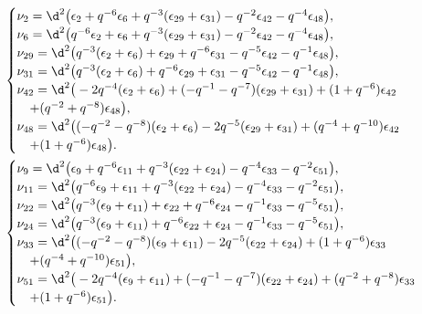 \begin{align*}
&\begin{cases}
\nu_{2} = \d^{2}\big(\epsilon_{2} + q^{-6}\epsilon_{6} + q^{-3}(\epsilon_{29}+\epsilon_{31}) - q^{-2}\epsilon_{42} - q^{-4}\epsilon_{48}\big),\\
\nu_{6} = \d^{2}\big(q^{-6}\epsilon_{2} + \epsilon_{6} + q^{-3}(\epsilon_{29}+\epsilon_{31}) - q^{-2}\epsilon_{42} - q^{-4}\epsilon_{48}\big),\\
\nu_{29} = \d^{2}\big(q^{-3}(\epsilon_{2}+\epsilon_{6}) + \epsilon_{29} + q^{-6}\epsilon_{31} - q^{-5}\epsilon_{42} - q^{-1}\epsilon_{48}\big),\\
\nu_{31} = \d^{2}\big(q^{-3}(\epsilon_{2}+\epsilon_{6}) + q^{-6}\epsilon_{29} + \epsilon_{31} - q^{-5}\epsilon_{42} - q^{-1}\epsilon_{48}\big),\\
\nu_{42} = \d^{2}\big(-2q^{-4}(\epsilon_{2}+\epsilon_{6}) + (-q^{-1} - q^{-7})(\epsilon_{29}+\epsilon_{31}) + (1 + q^{-6})\epsilon_{42}\\
\quad+ (q^{-2} + q^{-8})\epsilon_{48}\big),\\
\nu_{48} = \d^{2}\big((-q^{-2} - q^{-8})(\epsilon_{2}+\epsilon_{6}) - 2q^{-5}(\epsilon_{29}+\epsilon_{31}) + (q^{-4} + q^{-10})\epsilon_{42}\\
\quad+ (1 + q^{-6})\epsilon_{48}\big).
\end{cases}
\\
&\begin{cases}
\nu_{9} = \d^{2}\big(\epsilon_{9} + q^{-6}\epsilon_{11} + q^{-3}(\epsilon_{22}+\epsilon_{24}) - q^{-4}\epsilon_{33} - q^{-2}\epsilon_{51}\big),\\
\nu_{11} = \d^{2}\big(q^{-6}\epsilon_{9} + \epsilon_{11} + q^{-3}(\epsilon_{22}+\epsilon_{24}) - q^{-4}\epsilon_{33} - q^{-2}\epsilon_{51}\big),\\
\nu_{22} = \d^{2}\big(q^{-3}(\epsilon_{9}+\epsilon_{11}) + \epsilon_{22} + q^{-6}\epsilon_{24} - q^{-1}\epsilon_{33} - q^{-5}\epsilon_{51}\big),\\
\nu_{24} = \d^{2}\big(q^{-3}(\epsilon_{9}+\epsilon_{11}) + q^{-6}\epsilon_{22} + \epsilon_{24} - q^{-1}\epsilon_{33} - q^{-5}\epsilon_{51}\big),\\
\nu_{33} = \d^{2}\big((-q^{-2} - q^{-8})(\epsilon_{9}+\epsilon_{11}) - 2q^{-5}(\epsilon_{22}+\epsilon_{24}) + (1 + q^{-6})\epsilon_{33}\\
\quad+ (q^{-4} + q^{-10})\epsilon_{51}\big),\\
\nu_{51} = \d^{2}\big(-2q^{-4}(\epsilon_{9}+\epsilon_{11}) + (-q^{-1} - q^{-7})(\epsilon_{22}+\epsilon_{24}) + (q^{-2} + q^{-8})\epsilon_{33}\\
\quad+ (1 + q^{-6})\epsilon_{51}\big).
\end{cases}
\end{align*}

